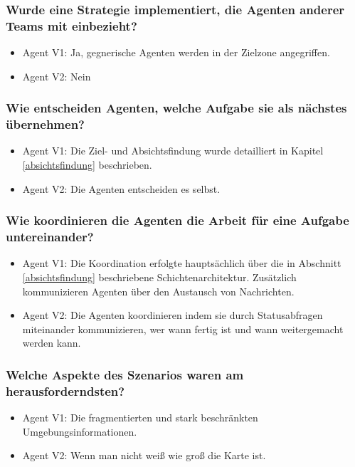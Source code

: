 \documentclass[runningheads]{llncs}
\begin{document}
\subsubsection{Wurde eine Strategie implementiert, die Agenten anderer Teams mit einbezieht?}
\begin{itemize}
\item Agent V1: Ja, gegnerische Agenten werden in der Zielzone angegriffen.
\item Agent V2: Nein
\end{itemize}

\subsubsection{Wie entscheiden Agenten, welche Aufgabe sie als nächstes übernehmen?}
\begin{itemize}
\item Agent V1: Die Ziel- und Absichtsfindung wurde detailliert in Kapitel \ref{absichtsfindung} beschrieben.
\item Agent V2: Die Agenten entscheiden es selbst.
\end{itemize}

\subsubsection{Wie koordinieren die Agenten die Arbeit für eine Aufgabe untereinander?}
\begin{itemize}
\item Agent V1: Die Koordination erfolgte hauptsächlich über die in Abschnitt \ref{absichtsfindung} beschriebene Schichtenarchitektur. Zusätzlich kommunizieren Agenten über den Austausch von Nachrichten.
\item Agent V2: Die Agenten koordinieren indem sie durch Statusabfragen miteinander kommunizieren, wer wann fertig ist und wann weitergemacht werden kann.
\end{itemize}

\subsubsection{Welche Aspekte des Szenarios waren am herausforderndsten?}
\begin{itemize}
\item Agent V1: Die fragmentierten und stark beschränkten Umgebungsinformationen. 
\item Agent V2: Wenn man nicht weiß wie groß die Karte ist.
\end{itemize}
\end{document}
